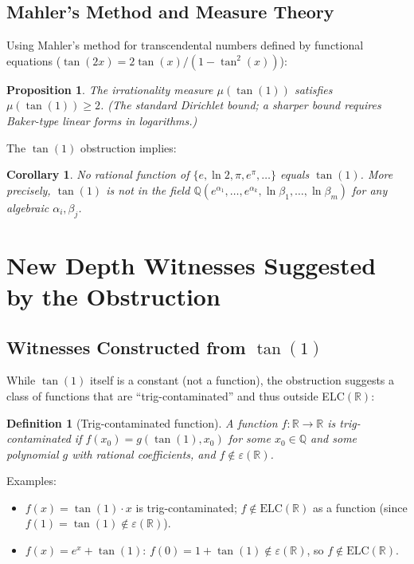 \documentclass[11pt]{article}
\newtheorem{proposition}[theorem]{Proposition}
\newtheorem{corollary}[theorem]{Corollary}
\newtheorem{definition}[theorem]{Definition}
\begin{document}
\subsection{Mahler's Method and Measure Theory}

Using Mahler's method for transcendental numbers defined by functional equations
($\tan(2x)=2\tan(x)/(1-\tan^2(x))$):

\begin{proposition}
The irrationality measure $\mu(\tan(1))$ satisfies $\mu(\tan(1))\geq2$.
(The standard Dirichlet bound; a sharper bound requires Baker-type linear forms in logarithms.)
\end{proposition}

The $\tan(1)$ obstruction implies:
\begin{corollary}
No rational function of $\{e, \ln 2, \pi, e^\pi, \ldots\}$ equals $\tan(1)$.
More precisely, $\tan(1)$ is not in the field
$\mathbb{Q}(e^{\alpha_1},\ldots,e^{\alpha_k},\ln\beta_1,\ldots,\ln\beta_m)$
for any algebraic $\alpha_i, \beta_j$.
\end{corollary}

\section{New Depth Witnesses Suggested by the Obstruction}

\subsection{Witnesses Constructed from $\tan(1)$}

While $\tan(1)$ itself is a constant (not a function), the obstruction suggests a class
of functions that are ``trig-contaminated'' and thus outside ELC$(\mathbb{R})$:

\begin{definition}[Trig-contaminated function]
A function $f:\mathbb{R}\to\mathbb{R}$ is \emph{trig-contaminated} if
$f(x_0)=g(\tan(1),x_0)$ for some $x_0\in\mathbb{Q}$ and some polynomial $g$ with
rational coefficients, and $f\notin\varepsilon(\mathbb{R})$.
\end{definition}

Examples:
\begin{itemize}
  \item $f(x)=\tan(1)\cdot x$ is trig-contaminated; $f\notin\mathrm{ELC}(\mathbb{R})$ as
    a function (since $f(1)=\tan(1)\notin\varepsilon(\mathbb{R})$).
  \item $f(x)=e^x+\tan(1)$: $f(0)=1+\tan(1)\notin\varepsilon(\mathbb{R})$,
    so $f\notin\mathrm{ELC}(\mathbb{R})$.
\end{itemize}
\end{document}
